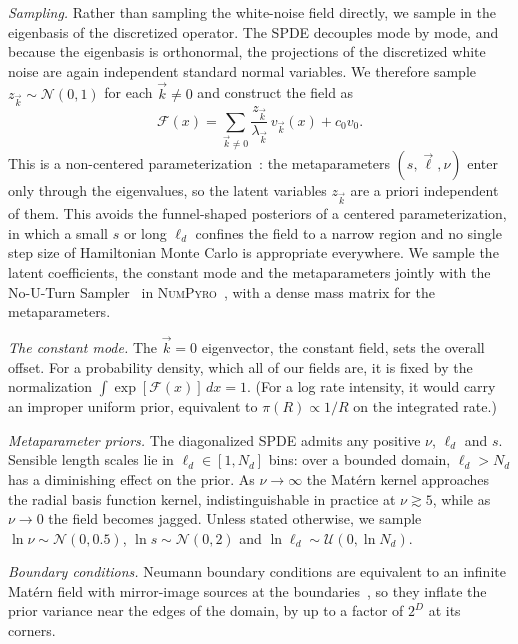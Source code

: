 \textit{Sampling.} Rather than sampling the white-noise field directly, we sample in the eigenbasis of the discretized operator. The \ac{SPDE} decouples mode by mode, and because the eigenbasis is orthonormal, the projections of the discretized white noise are again independent standard normal variables. We therefore sample $z_{\vec{k}} \sim \mathcal{N}(0,1)$ for each $\vec{k}\neq 0$ and construct the field as
\begin{equation}
    \mathcal{F}(x) = \sum_{\vec{k}\neq 0} \frac{z_{\vec{k}}}{\lambda_{\vec{k}}}\, v_{\vec{k}}(x) + c_0 v_0.
    \label{eq: eigenbasis sampling}
\end{equation}
This is a non-centered parameterization~\cite{Papaspiliopoulos:2007abc, Betancourt:2017ebh}: the metaparameters $(s, \vec{\ell}, \nu)$ enter only through the eigenvalues, so the latent variables $z_{\vec{k}}$ are a priori independent of them. This avoids the funnel-shaped posteriors of a centered parameterization, in which a small $s$ or long $\ell_d$ confines the field to a narrow region and no single step size of Hamiltonian Monte Carlo is appropriate everywhere. We sample the latent coefficients, the constant mode and the metaparameters jointly with the No-U-Turn Sampler~\cite{Hoffman:2014nuts} in \textsc{NumPyro}~\cite{Phan:2019numpyro, Bingham:2019pyro}, with a dense mass matrix for the metaparameters.

\textit{The constant mode.} The $\vec{k} = 0$ eigenvector, the constant field, sets the overall offset. For a probability density, which all of our fields are, it is fixed by the normalization $\int \exp[\mathcal{F}(x)]\,dx = 1$. (For a log rate intensity, it would carry an improper uniform prior, equivalent to $\pi(R) \propto 1/R$ on the integrated rate.)

\textit{Metaparameter priors.} The diagonalized \ac{SPDE} admits any positive $\nu$, $\ell_d$ and $s$. Sensible length scales lie in $\ell_d \in [1, N_d]$ bins: over a bounded domain, $\ell_d > N_d$ has a diminishing effect on the prior. As $\nu \to \infty$ the Mat\'ern kernel approaches the radial basis function kernel, indistinguishable in practice at $\nu \gtrsim 5$, while as $\nu \to 0$ the field becomes jagged. Unless stated otherwise, we sample $\ln\nu\sim \mathcal{N}(0,0.5)$, $\ln s\sim\mathcal{N}(0,2)$ and $\ln\ell_d \sim \mathcal{U}(0,\ln N_d)$.

\textit{Boundary conditions.} Neumann boundary conditions are equivalent to an infinite Mat\'ern field with mirror-image sources at the boundaries~\cite{lindgren_explicit_2011}, so they inflate the prior variance near the edges of the domain, by up to a factor of $2^D$ at its corners.

